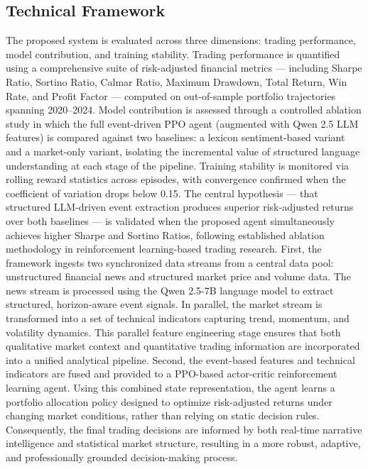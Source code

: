 \documentclass[a4paper,fleqn]{cas-sc}
\begin{document}
\subsection{Technical Framework}\label{sec:Technical}
The proposed system is evaluated across three dimensions: trading performance, model contribution, and training stability. Trading performance is quantified using a comprehensive suite of risk-adjusted financial metrics — including Sharpe Ratio, Sortino Ratio, Calmar Ratio, Maximum Drawdown, Total Return, Win Rate, and Profit Factor — computed on out-of-sample portfolio trajectories spanning 2020–2024. Model contribution is assessed through a controlled ablation study in which the full event-driven PPO agent (augmented with Qwen 2.5 LLM features) is compared against two baselines: a lexicon sentiment-based variant and a market-only variant, isolating the incremental value of structured language understanding at each stage of the pipeline. Training stability is monitored via rolling reward statistics across episodes, with convergence confirmed when the coefficient of variation drops below 0.15. The central hypothesis — that structured LLM-driven event extraction produces superior risk-adjusted returns over both baselines — is validated when the proposed agent simultaneously achieves higher Sharpe and Sortino Ratios, following established ablation methodology in reinforcement learning-based trading research. First, the framework ingests two synchronized data streams from a central data pool: unstructured financial news and structured market price and volume data. The news stream is processed using the Qwen 2.5-7B language model to extract structured, horizon-aware event signals. In parallel, the market stream is transformed into a set of technical indicators capturing trend, momentum, and volatility dynamics. This parallel feature engineering stage ensures that both qualitative market context and quantitative trading information are incorporated into a unified analytical pipeline. 
Second, the event-based features and technical indicators are fused and provided to a PPO-based actor-critic reinforcement learning agent. Using this combined state representation, the agent learns a portfolio allocation policy designed to optimize risk-adjusted returns under changing market conditions, rather than relying on static decision rules. Consequently, the final trading decisions are informed by both real-time narrative intelligence and statistical market structure, resulting in a more robust, adaptive, and professionally grounded decision-making process. 
\end{document}
